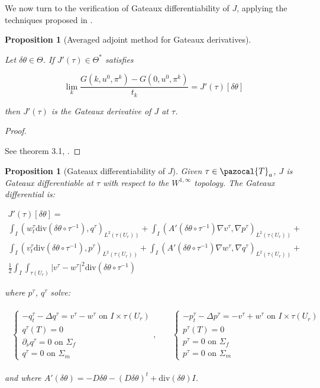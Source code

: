 \documentclass[english,a4paper,10pt,oneside]{scrbook}	%
\theoremstyle{break}
\newtheorem{prop}[equation]{Proposition}
\newenvironment{mproof}[1][\proofname]{%
  \begin{proof}[#1]$ $\par\nobreak\ignorespaces
}{%
  \end{proof}
}
\renewcommand*{\proofname}{Proof}
\theoremstyle{remark}
\newcommand{\cT}{\pazocal{T}}
\newcommand{\te}{\theta}
\newcommand{\Te}{\Theta}
\newcommand{\dive}{\text{div}}
\begin{document}
We now turn to the verification of Gateaux differentiability of $J$, applying the techniques proposed in \cite{avg_adj}.

\begin{prop}[Averaged adjoint method for Gateaux derivatives]
\label{prop:adv_adj}

Let $\delta \te \in \Te$. If $J'(\tau) \in \Te^*$ satisfies

$$\lim_{k}\frac{G(k,u^0,\pi^k)-G(0,u^0,\pi^k)}{t_k}=J'(\tau)[\delta \te]$$

then $J'(\tau)$ is the Gateaux derivative of $J$ at $\tau$.

\end{prop}

\begin{mproof}

See theorem 3.1, \cite{avg_adj}.
\end{mproof}

\begin{prop}[Gateaux differentiability of $J$]
\label{prop:gateaux_diff}
Given $\tau \in \cT_a$, $J$ is Gateaux differentiable at $\tau$ with respect to the $W^{1,\infty}$ topology. The Gateaux differential is:


\begin{align*}
J'(\tau)[\delta \te] =\\ \int_I (w_t^\tau \dive(\delta \te\circ  \tau^{-1}), q^\tau )_{L^2(\tau(U_r))}+ \int_I (A'(\delta\te \circ \tau^{-1})\nabla v^\tau, \nabla p^\tau)_{L^2(\tau(U_r))}+\\
\int_I (v_t^\tau \dive(\delta \te\circ  \tau^{-1}), p^\tau )_{L^2(\tau(U_r))}+ \int_I (A'(\delta\te \circ \tau^{-1})\nabla w^\tau, \nabla q^\tau)_{L^2(\tau(U_r))}+\\
\frac{1}{2}\int_I\int_{\tau(U_r)}|v^\tau-w^\tau|^2\dive(\delta \te\circ  \tau^{-1})
\end{align*}

where $p^\tau$, $q^\tau$ solve:

\begin{align*}
\begin{matrix}
\left\{\begin{matrix}
-q^\tau_t-\Delta q^\tau =v^\tau-w^\tau \text{ on } I \times \tau(U_r)\\
q^\tau(T)=0\\
\partial_\nu q^\tau = 0 \text{ on } \Sigma_f\\
q^\tau = 0 \text{ on } \Sigma_m
\end{matrix}\right., \quad & \left\{\begin{matrix}
-p^\tau_t-\Delta p^\tau = - v^\tau+ w^\tau  \text{ on } I \times \tau(U_r)\\
p^\tau(T)=0\\
p^\tau = 0 \text{ on } \Sigma_f \\
p^\tau = 0 \text{ on } \Sigma_m
\end{matrix}\right.
\end{matrix}
\end{align*}

and where $A'(\delta\te )= - D\delta \te -(D\delta\te)^t + \dive(\delta\te)I$.

\end{prop}
\end{document}

